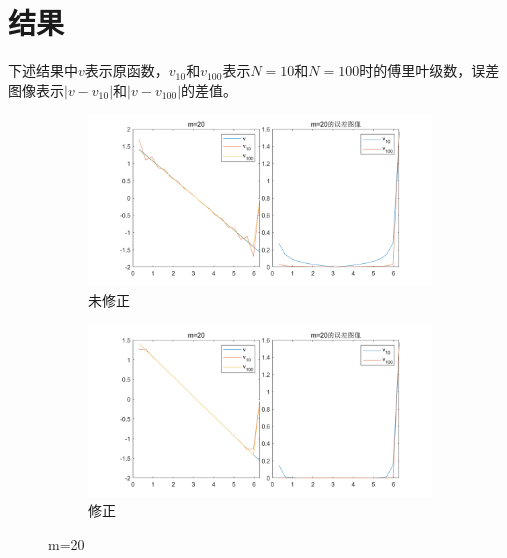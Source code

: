 \documentclass{article}
\begin{document}
\section{结果}
下述结果中$v$表示原函数，$v_{10}$和$v_{100}$表示$N=10$和$N=100$时的傅里叶级数，误差图像表示$\left|v-v_{10}\right|$和$\left|v-v_{100}\right|$的差值。
\begin{figure}[htbp]
    \centering
    \begin{subfigure}[b]{0.47\textwidth}
        \centering
        \includegraphics[width=\textwidth]{m=20.png}
        \caption{未修正}
    \end{subfigure}
    \begin{subfigure}[b]{0.47\textwidth}
        \centering
        \includegraphics[width=\textwidth]{m=20修正.png}
        \caption{修正}
    \end{subfigure}
    \caption{m=20}
\end{figure}
\end{document}

